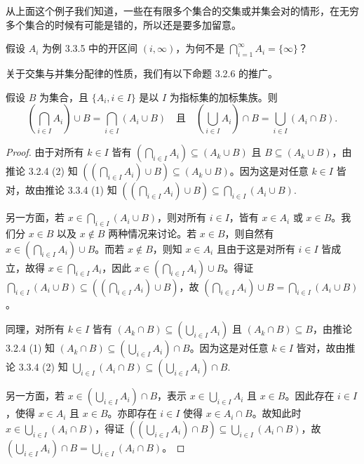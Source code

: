 从上面这个例子我们知道，一些在有限多个集合的交集或并集会对的情形，在无穷多个集合的时候有可能是错的，所以还是要多加留意。

\begin{question}
假设 $A_i$ 为例 3.3.5 中的开区间 $(i, \infty)$，为何不是 $\bigcap_{i=1}^{\infty} A_i = \{\infty\}$？
\end{question}

关于交集与并集分配律的性质，我们有以下命题 3.2.6 的推广。

\begin{proposition}
假设 $B$ 为集合，且 $\{A_i, i \in I\}$ 是以 $I$ 为指标集的加标集族。则
$$ \left( \bigcap_{i \in I} A_i \right) \cup B = \bigcap_{i \in I} (A_i \cup B) \quad \text{且} \quad \left( \bigcup_{i \in I} A_i \right) \cap B = \bigcup_{i \in I} (A_i \cap B). $$
\end{proposition}

\begin{proof}
由于对所有 $k \in I$ 皆有 $(\bigcap_{i \in I} A_i) \subseteq (A_k \cup B)$ 且 $B \subseteq (A_k \cup B)$，由推论 3.2.4 (2) 知 $((\bigcap_{i \in I} A_i) \cup B) \subseteq (A_k \cup B)$。因为这是对任意 $k \in I$ 皆对，故由推论 3.3.4 (1) 知
$ \left( \left( \bigcap_{i \in I} A_i \right) \cup B \right) \subseteq \bigcap_{i \in I} (A_i \cup B). $

另一方面，若 $x \in \bigcap_{i \in I} (A_i \cup B)$，则对所有 $i \in I$，皆有 $x \in A_i$ 或 $x \in B$。我们分 $x \in B$ 以及 $x \notin B$ 两种情况来讨论。若 $x \in B$，则自然有 $x \in (\bigcap_{i \in I} A_i) \cup B$。而若 $x \notin B$，则知 $x \in A_i$ 且由于这是对所有 $i \in I$ 皆成立，故得 $x \in \bigcap_{i \in I} A_i$，因此 $x \in (\bigcap_{i \in I} A_i) \cup B$。得证 $\bigcap_{i \in I} (A_i \cup B) \subseteq ((\bigcap_{i \in I} A_i) \cup B)$，故 $(\bigcap_{i \in I} A_i) \cup B = \bigcap_{i \in I} (A_i \cup B)$。

同理，对所有 $k \in I$ 皆有 $(A_k \cap B) \subseteq (\bigcup_{i \in I} A_i)$ 且 $(A_k \cap B) \subseteq B$，由推论 3.2.4 (1) 知 $(A_k \cap B) \subseteq (\bigcup_{i \in I} A_i) \cap B$。因为这是对任意 $k \in I$ 皆对，故由推论 3.3.4 (2) 知
$ \bigcup_{i \in I} (A_i \cap B) \subseteq \left( \bigcup_{i \in I} A_i \right) \cap B. $

另一方面，若 $x \in (\bigcup_{i \in I} A_i) \cap B$，表示 $x \in \bigcup_{i \in I} A_i$ 且 $x \in B$。因此存在 $i \in I$，使得 $x \in A_i$ 且 $x \in B$。亦即存在 $i \in I$ 使得 $x \in A_i \cap B$。故知此时 $x \in \bigcup_{i \in I} (A_i \cap B)$，得证 $((\bigcup_{i \in I} A_i) \cap B) \subseteq \bigcup_{i \in I} (A_i \cap B)$，故 $(\bigcup_{i \in I} A_i) \cap B = \bigcup_{i \in I} (A_i \cap B)$。
\end{proof}

